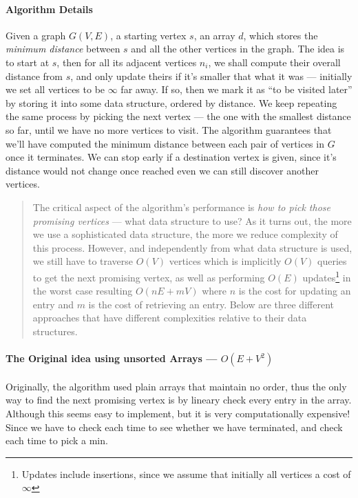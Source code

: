 \documentclass[12pt]{article}
\begin{document}
\paragraph{Algorithm Details} Given a graph $G(V,E)$, a starting vertex $s$, an array $d$, which stores the \textit{minimum distance} between $s$ and all the other vertices in the graph. The idea is to start at $s$, then for all its adjacent vertices $n_i$, we shall compute their overall distance from $s$, and only update theirs if it's smaller that what it was --- initially we set all vertices to be $\infty$ far away. If so, then we mark it as ``to be visited later'' by storing it into some data structure, ordered by distance. We keep repeating the same process by picking the next vertex --- the one with the smallest distance so far, until we have no more vertices to visit. The algorithm guarantees that we'll have computed the minimum distance between each pair of vertices in $G$ once it terminates. We can stop early if a destination vertex is given, since it's distance would not change once reached even we can still discover another vertices. \\

\begin{quotation}
The critical aspect of the algorithm's performance is \textit{how to pick those promising vertices} --- what data structure to use? As it turns out, the more we use a sophisticated data structure, the more we reduce complexity of this process. However, and independently from what data structure is used, we still have to traverse $O(V)$ vertices which is implicitly $O(V)$ queries to get the next promising vertex, as well as performing $O(E)$ updates\footnote{Updates include insertions, since we assume that initially all vertices a cost of $\infty$} in the worst case resulting $O(nE + mV)$ where $n$ is the cost for updating an entry and $m$ is the cost of retrieving an entry. Below are three different approaches that have different complexities relative to their data structures.
\end{quotation}

\paragraph{The Original idea using unsorted Arrays --- $O(E + V^2)$}

Originally, the algorithm used plain arrays that maintain no order, thus the only way to find the next promising vertex is by lineary check every entry in the array. Although this seems easy to implement, but it is very computationally expensive! Since we have to check each time to see whether we have terminated, and check each time to pick a min.
\end{document}
